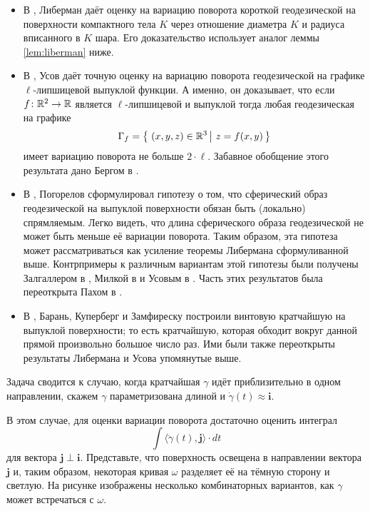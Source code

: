 \documentclass[a4paper,10pt]{article}
\begin{document}
\begin{itemize}
\item В \cite{liberman}, Либерман даёт оценку на вариацию поворота короткой геодезической на поверхности компактного тела $K$ через отношение диаметра $K$ и радиуса вписанного в $K$ шара.
Его доказательство использует аналог леммы \ref{lem:liberman} ниже.

\item В \cite{usov}, 
Усов даёт точную оценку на вариацию поворота геодезической на графике $\ell$-липшицевой выпуклой функции. 
А именно, он доказывает, что если $f\colon\mathbb{R}^2\to\mathbb{R}$ является $\ell$-липшицевой и выпуклой тогда любая геодезическая на графике \[\Gamma_f=\set{(x,y,z)\in \RR^3}{z=f(x,y)}\] 
имеет вариацию поворота не больше $2\cdot \ell$.
Забавное обобщение этого результата дано Бергом в \cite{berg}.

\item В \cite{pogorelov}, Погорелов сформулировал гипотезу о том, что сферический образ геодезической на выпуклой поверхности обязан быть (локально) спрямляемым.
Легко видеть, что длина сферического образа геодезической не может быть меньше её вариации поворота.
Таким образом, эта гипотеза может рассматриваться как усиление теоремы Либермана сформуливанной выше.
Контрпримеры к различным вариантам этой гипотезы были получены Залгаллером в \cite{zalgaller},
Милкой в \cite{milka}
и Усовым в \cite{usov-conj-pog}.
Часть этих результатов была переоткрыта Пахом в \cite{pach}.

\item В \cite{BKZ},
Барань,
Куперберг
и Замфиреску построили винтовую кратчайшую на выпуклой поверхности;
то есть кратчайшую, которая обходит вокруг данной прямой произвольно большое число раз.
Ими были также переоткрыты результаты Либермана и Усова упомянутые выше.
\end{itemize}

Задача сводится к случаю, когда кратчайшая $\gamma$ идёт приблизительно в одном направлении, 
скажем $\gamma$ параметризована длиной и $\dot\gamma(t)\approx\bm{i}$.

В этом случае, для оценки вариации поворота достаточно оценить интеграл
\[\int\langle\ddot\gamma(t),\bm{j}\rangle\cdot dt\] 
для вектора $\bm{j}\perp\bm{i}$.
Представьте, что поверхность освещена в направлении вектора $\bm{j}$ и, таким образом, некоторая кривая $\omega$ разделяет её на тёмную сторону и светлую.
На рисунке изображены несколько комбинаторных вариантов, как $\gamma$ может встречаться с $\omega$.
\end{document}
